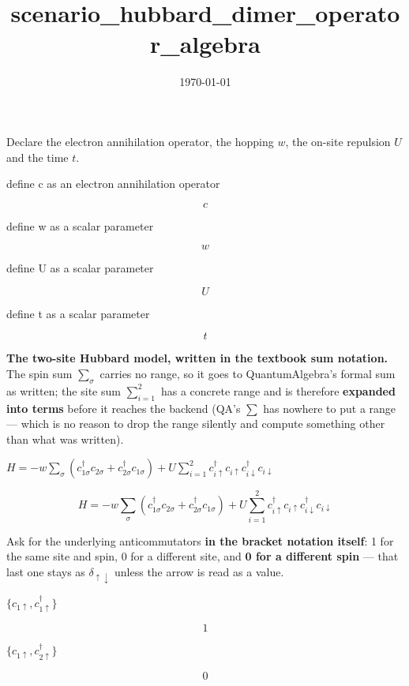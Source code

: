 \documentclass[dvipdfmx]{article}
\title{scenario\_hubbard\_dimer\_operator\_algebra}
\date{\today}
\begin{document}
\maketitle

Declare the electron annihilation operator, the hopping $w$, the on-site repulsion $U$ and the time $t$.

define c as an electron annihilation operator

\[
  c
\]

define w as a scalar parameter

\[
  w
\]

define U as a scalar parameter

\[
  U
\]

define t as a scalar parameter

\[
  t
\]

\textbf{The two-site Hubbard model, written in the textbook sum notation.} The spin sum $\sum_\sigma$ carries no range, so it goes to QuantumAlgebra's formal sum as written; the site sum $\sum_{i=1}^{2}$ has a concrete range and is therefore \textbf{expanded into terms} before it reaches the backend (QA's $\sum$ has nowhere to put a range — which is no reason to drop the range silently and compute something other than what was written).

$H = -w \sum_{\sigma} (c^\dagger_{1\sigma} c_{2\sigma} + c^\dagger_{2\sigma} c_{1\sigma}) + U \sum_{i=1}^{2} c^\dagger_{i\uparrow} c_{i\uparrow} c^\dagger_{i\downarrow} c_{i\downarrow}$

\begin{equation}
  H = -w \sum_{\sigma} (c^\dagger_{1\sigma} c_{2\sigma} + c^\dagger_{2\sigma} c_{1\sigma}) + U \sum_{i=1}^{2} c^\dagger_{i\uparrow} c_{i\uparrow} c^\dagger_{i\downarrow} c_{i\downarrow}
  \label{eq:E1}
\end{equation}

Ask for the underlying anticommutators \textbf{in the bracket notation itself}: 1 for the same site and spin, 0 for a different site, and \textbf{0 for a different spin} — that last one stays as $\delta_{\uparrow\downarrow}$ unless the arrow is read as a value.

$\{c_{1\uparrow}, c^\dagger_{1\uparrow}\}$

\begin{equation}
  1
  \label{eq:E2}
\end{equation}

$\{c_{1\uparrow}, c^\dagger_{2\uparrow}\}$

\begin{equation}
  0
  \label{eq:E3}
\end{equation}
\end{document}
